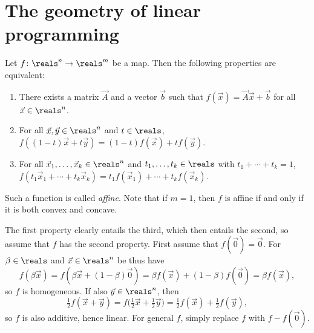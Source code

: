 \documentclass[article, a4paper, 11pt, oneside]{memoir}
\title{\doctitle}
\author{\docauthor}
\numberwithin{equation}{chapter}
\theoremstyle{nonumberplain}
\begin{document}
\maketitle

\addtocounter{chapter}{1}
\chapter{The geometry of linear programming}

\newcommand{\keyword}[1]{{\bfseries \textit{#1}}}
\newcommand{\mat}{\vec}


\begin{remark}
    Let $f \colon \reals^n \to \reals^m$ be a map. Then the following properties are equivalent:
    \begin{enumerate}
        \item There exists a matrix $\mat{A}$ and a vector $\vec{b}$ such that $f(\vec{x}) = \mat{A}\vec{x} + \vec{b}$ for all $\vec{x} \in \reals^n$.
        
        \item For all $\vec{x},\vec{y} \in \reals^n$ and $t \in \reals$, $f((1-t)\vec{x} + t\vec{y}) = (1-t)f(\vec{x}) + tf(\vec{y})$.

        \item For all $\vec{x}_1, \ldots, \vec{x}_k \in \reals^n$ and $t_1, \ldots, t_k \in \reals$ with $t_1 + \cdots + t_k = 1$, $f(t_1 \vec{x}_1 + \cdots + t_k \vec{x}_k) = t_1 f(\vec{x}_1) + \cdots + t_k f(\vec{x}_k)$.
    \end{enumerate}
    Such a function is called \emph{affine}. Note that if $m = 1$, then $f$ is affine if and only if it is both convex and concave.
    
    The first property clearly entails the third, which then entails the second, so assume that $f$ has the second property. First assume that $f(\vec{0}) = \vec{0}$. For $\beta \in \reals$ and $\vec{x} \in \reals^n$ be thus have
    \begin{equation*}
        f(\beta \vec{x})
            = f(\beta \vec{x} + (1-\beta)\vec{0})
            = \beta f(\vec{x}) + (1-\beta)f(\vec{0})
            = \beta f(\vec{x}),
    \end{equation*}
    so $f$ is homogeneous. If also $\vec{y} \in \reals^n$, then
    \begin{equation*}
        \tfrac{1}{2} f(\vec{x} + \vec{y})
            = f \bigl( \tfrac{1}{2} \vec{x} + \tfrac{1}{2} \vec{y} \bigr)
            = \tfrac{1}{2} f(\vec{x}) + \tfrac{1}{2} f(\vec{y}),
    \end{equation*}
    so $f$ is also additive, hence linear. For general $f$, simply replace $f$ with $f - f(\vec{0})$.
\end{remark}
\end{document}
